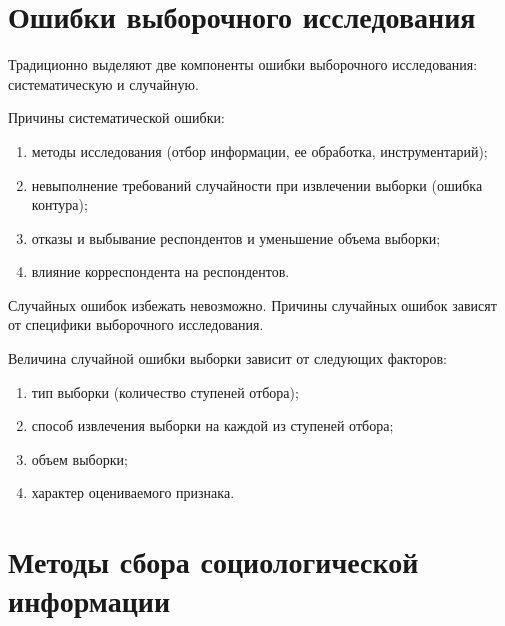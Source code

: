 \section{Ошибки выборочного исследования}

  Традиционно выделяют две компоненты ошибки выборочного исследования:
  систематическую и случайную.

  Причины систематической ошибки:
  \begin{enumerate}
    \item методы исследования (отбор информации, ее обработка, инструментарий);
    \item невыполнение требований случайности при извлечении выборки (ошибка
      контура);
    \item отказы и выбывание респондентов и уменьшение объема выборки;
    \item влияние корреспондента на респондентов.
  \end{enumerate}

  Случайных ошибок избежать невозможно. Причины случайных ошибок зависят от
  специфики выборочного исследования.

  Величина случайной ошибки выборки зависит от следующих факторов:
  \begin{enumerate}
    \item тип выборки (количество ступеней отбора);
    \item способ извлечения выборки на каждой из ступеней отбора;
    \item объем выборки;
    \item характер оцениваемого признака.
  \end{enumerate}

\section{Методы сбора социологической информации}

